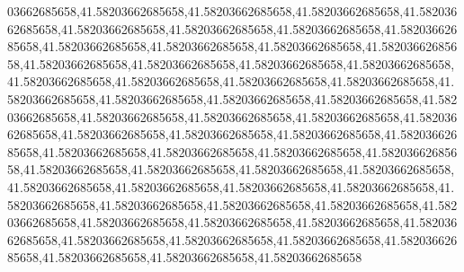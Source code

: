 03662685658,41.58203662685658,41.58203662685658,41.58203662685658,41.58203662685658,41.58203662685658,41.58203662685658,41.58203662685658,41.58203662685658,41.58203662685658,41.58203662685658,41.58203662685658,41.58203662685658,41.58203662685658,41.58203662685658,41.58203662685658,41.58203662685658,41.58203662685658,41.58203662685658,41.58203662685658,41.58203662685658,41.58203662685658,41.58203662685658,41.58203662685658,41.58203662685658,41.58203662685658,41.58203662685658,41.58203662685658,41.58203662685658,41.58203662685658,41.58203662685658,41.58203662685658,41.58203662685658,41.58203662685658,41.58203662685658,41.58203662685658,41.58203662685658,41.58203662685658,41.58203662685658,41.58203662685658,41.58203662685658,41.58203662685658,41.58203662685658,41.58203662685658,41.58203662685658,41.58203662685658,41.58203662685658,41.58203662685658,41.58203662685658,41.58203662685658,41.58203662685658,41.58203662685658,41.58203662685658,41.58203662685658,41.58203662685658,41.58203662685658,41.58203662685658,41.58203662685658,41.58203662685658,41.58203662685658,41.58203662685658,41.58203662685658
